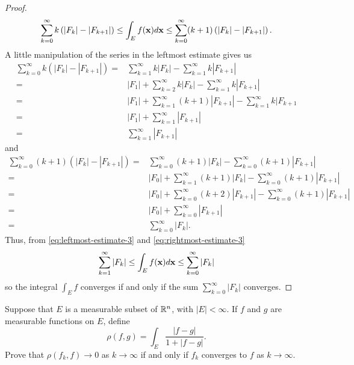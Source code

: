 \begin{proof}
\begin{equation}
\sum_{k=0}^\infty k\left(|F_k|-|F_{k+1}|\right)\leq
\int_E f(\mathbf{x}) d \mathbf{x}\leq
\sum_{k=0}^\infty (k+1)\left(|F_k|-|F_{k+1}|\right).
\end{equation}
A little manipulation of the series in the leftmost estimate gives us
\begin{equation}
\label{eq:leftmost-estimate-3}
\begin{aligned}
\sum_{k=0}^\infty k\left(|F_k|-|F_{k+1}|\right)
={}&\sum_{k=1}^\infty k|F_k|-\sum_{k=1}^\infty k|F_{k+1}|\\
={}&|F_1|+\sum_{k=2}^\infty k|F_k|-\sum_{k=1}^\infty k|F_{k+1}|\\
={}&|F_1|+\sum_{k=1}^\infty(k+1)|F_{k+1}|-\sum_{k=1}^\infty k|F_{k+1}\\
={}&|F_1|+\sum_{k=1}^\infty |F_{k+1}|\\
={}&\sum_{k=1}^\infty|F_{k+1}|
\end{aligned}
\end{equation}
and
\begin{equation}
\label{eq:rightmost-estimate-3}
\begin{aligned}
\sum_{k=0}^\infty(k+1)\left(|F_k|-|F_{k+1}|\right)
={}&\sum_{k=0}^\infty(k+1)|F_k|-\sum_{k=0}^\infty(k+1)|F_{k+1}|\\
={}&|F_0|+\sum_{k=1}^\infty(k+1)|F_k|-\sum_{k=0}^\infty(k+1)|F_{k+1}|\\
={}&|F_0|+\sum_{k=0}^\infty(k+2)|F_{k+1}|-\sum_{k=0}^\infty(k+1)|F_{k+1}|\\
={}&|F_0|+\sum_{k=0}^\infty|F_{k+1}|\\
={}&\sum_{k=0}^\infty|F_k|.
\end{aligned}
\end{equation}
Thus, from \eqref{eq:leftmost-estimate-3} and
\eqref{eq:rightmost-estimate-3}
\begin{equation}
\label{eq:final-upper-lower-estimates-3}
\sum_{k=1}^\infty|F_k|\leq\int_E f(\mathbf{x}) d \mathbf{x}\leq\sum_{k=0}^\infty|F_k|
\end{equation}
so the integral $\int_E f$ converges if and only if the sum
$\sum_{k=0}^\infty|F_k|$ converges.
\end{proof}
\begin{problem}
Suppose that $E$ is a measurable subset of $\mathbb{R}^n$, with
$|E|<\infty$. If $f$ and $g$ are measurable functions on
$E$, define
\[
\rho(f,g)=\int_E\frac{|f-g|}{1+|f-g|}.
\]
Prove that $\rho(f_k,f)\to 0$ as $k\to\infty$ if and only if $f_k$
converges to $f$ as $k\to\infty$.
\end{problem}
